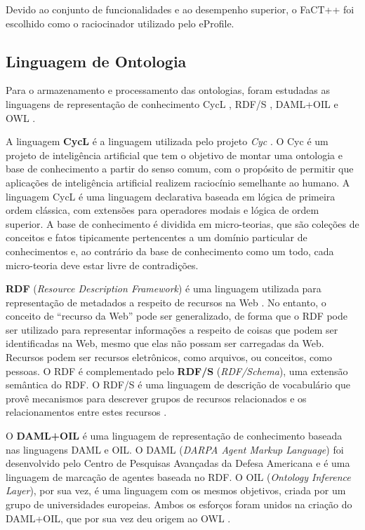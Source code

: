 Devido ao conjunto de funcionalidades e ao desempenho superior, o FaCT++ foi escolhido como o raciocinador utilizado pelo eProfile.


\subsection{Linguagem de Ontologia}
\label{sec:ling_ontologia}

Para o armazenamento e processamento das ontologias, foram estudadas as linguagens de representação de conhecimento CycL \cite{lenat89}, RDF/S \cite{rdfs}, DAML+OIL \cite{daconta03} e OWL \cite{daconta03}.

A linguagem \textbf{CycL} é a linguagem utilizada pelo projeto \emph{Cyc} \cite{lenat89}. O Cyc é um projeto de inteligência artificial que tem o objetivo de montar uma ontologia e base de conhecimento a partir do senso comum, com o propósito de permitir que aplicações de inteligência artificial realizem raciocínio semelhante ao humano. A linguagem CycL é uma linguagem declarativa baseada em lógica de primeira ordem clássica, com extensões para operadores modais e lógica de ordem superior. A base de conhecimento é dividida em micro-teorias, que são coleções de conceitos e fatos tipicamente pertencentes a um domínio particular de conhecimentos e, ao contrário da base de conhecimento como um todo, cada micro-teoria deve estar livre de contradições.

\textbf{RDF} ({\em Resource Description Framework}) é uma linguagem utilizada para representação de metadados a respeito de recursos na Web \cite{rdf}. No entanto, o conceito de ``recurso da Web'' pode ser generalizado, de forma que o RDF pode ser utilizado para representar informações a respeito de coisas que podem ser identificadas na Web, mesmo que elas não possam ser carregadas da Web. Recursos podem ser recursos eletrônicos, como arquivos, ou conceitos, como pessoas. O RDF é complementado pelo \textbf{RDF/S} ({\em RDF/Schema}), uma extensão semântica do RDF. O RDF/S é uma linguagem de descrição de vocabulário que provê mecanismos para descrever grupos de recursos relacionados e os relacionamentos entre estes recursos \cite{rdfs}.

O \textbf{DAML+OIL} é uma linguagem de representação de conhecimento baseada nas linguagens DAML e OIL. O DAML ({\em DARPA Agent Markup Language}) foi desenvolvido pelo Centro de Pesquisas Avançadas da Defesa Americana e é uma linguagem de marcação de agentes baseada no RDF. O OIL ({\em Ontology Inference Layer}), por sua vez, é uma linguagem com os mesmos objetivos, criada por um grupo de universidades europeias. Ambos os esforços foram unidos na criação do DAML+OIL, que por sua vez deu origem ao OWL \cite{daconta03}.

